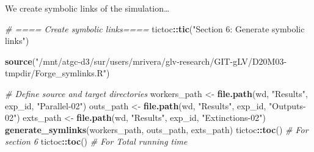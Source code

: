 \documentclass[
]{article}
\newenvironment{Shaded}{\begin{snugshade}}{\end{snugshade}}
\newcommand{\CommentTok}[1]{\textcolor[rgb]{0.56,0.35,0.01}{\textit{#1}}}
\newcommand{\FunctionTok}[1]{\textcolor[rgb]{0.13,0.29,0.53}{\textbf{#1}}}
\newcommand{\NormalTok}[1]{#1}
\newcommand{\OtherTok}[1]{\textcolor[rgb]{0.56,0.35,0.01}{#1}}
\newcommand{\SpecialCharTok}[1]{\textcolor[rgb]{0.81,0.36,0.00}{\textbf{#1}}}
\newcommand{\StringTok}[1]{\textcolor[rgb]{0.31,0.60,0.02}{#1}}
\begin{document}
We create symbolic links of the simulation\ldots{}

\begin{Shaded}
\begin{Highlighting}[]
\CommentTok{\# ==== Create symbolic links====}
\NormalTok{tictoc}\SpecialCharTok{::}\FunctionTok{tic}\NormalTok{(}\StringTok{"Section 6: Generate symbolic links"}\NormalTok{)}

\FunctionTok{source}\NormalTok{(}\StringTok{"/mnt/atgc{-}d3/sur/users/mrivera/glv{-}research/GIT{-}gLV/D20M03{-}tmpdir/Forge\_symlinks.R"}\NormalTok{)}

\CommentTok{\# Define source and target directories}
\NormalTok{workers\_path }\OtherTok{\textless{}{-}} \FunctionTok{file.path}\NormalTok{(wd, }\StringTok{"Results"}\NormalTok{, exp\_id, }\StringTok{"Parallel{-}02"}\NormalTok{)}
\NormalTok{outs\_path }\OtherTok{\textless{}{-}} \FunctionTok{file.path}\NormalTok{(wd, }\StringTok{"Results"}\NormalTok{, exp\_id, }\StringTok{"Outputs{-}02"}\NormalTok{)}
\NormalTok{exts\_path }\OtherTok{\textless{}{-}} \FunctionTok{file.path}\NormalTok{(wd, }\StringTok{"Results"}\NormalTok{, exp\_id, }\StringTok{"Extinctions{-}02"}\NormalTok{)}
\FunctionTok{generate\_symlinks}\NormalTok{(workers\_path, outs\_path, exts\_path)}
\NormalTok{tictoc}\SpecialCharTok{::}\FunctionTok{toc}\NormalTok{() }\CommentTok{\# For section 6}
\NormalTok{tictoc}\SpecialCharTok{::}\FunctionTok{toc}\NormalTok{() }\CommentTok{\# For Total running time}
\end{Highlighting}
\end{Shaded}
\end{document}
